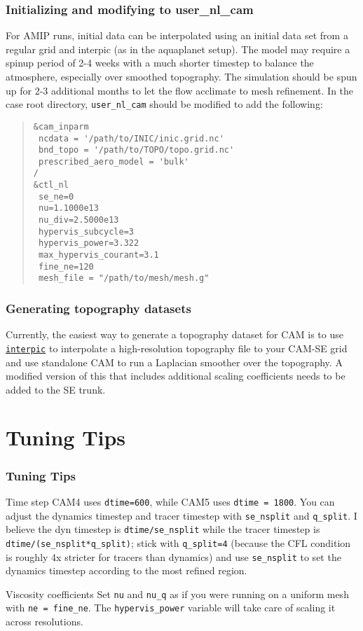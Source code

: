 \documentclass{beamer}
\newcommand{\interpic}{\hyperlink{interpic}{\texttt{interpic}}}
\begin{document}
%
\begin{frame}[containsverbatim]
\frametitle{Initializing and modifying to user\_nl\_cam }
\begin{block}{}
For AMIP runs, initial data can be interpolated using an initial data set from a regular grid and interpic (as in the aquaplanet setup). The model may require a spinup period of 2-4 weeks with a much shorter timestep to balance the atmosphere, especially over smoothed topography. The simulation should be spun up for 2-3 additional months to let the flow acclimate to mesh refinement. In the case root directory, \verb|user_nl_cam| should be modified to add the following:
\end{block}
\begin{block}{}
\begin{quote}
\tiny
\begin{verbatim}
&cam_inparm
 ncdata = '/path/to/INIC/inic.grid.nc'
 bnd_topo = '/path/to/TOPO/topo.grid.nc'
 prescribed_aero_model = 'bulk'
/
&ctl_nl
 se_ne=0
 nu=1.1000e13
 nu_div=2.5000e13
 hypervis_subcycle=3
 hypervis_power=3.322
 max_hypervis_courant=3.1
 fine_ne=120
 mesh_file = "/path/to/mesh/mesh.g"
\end{verbatim}
\end{quote}
\end{block}
\end{frame}
%
\begin{frame}
\frametitle{Generating topography datasets}
\begin{block}{}
Currently, the easiest way to generate a topography dataset for CAM is to use \interpic{} to interpolate a high-resolution topography file to your CAM-SE grid and use standalone CAM to run a Laplacian smoother over the topography. A modified version of this that includes additional scaling coefficients needs to be added to the SE trunk.
\end{block}
\end{frame}
%
\section{Tuning Tips}
\begin{frame}[containsverbatim]
\frametitle{Tuning Tips}
\begin{block}{Time step}
CAM4 uses \verb|dtime=600|, while CAM5 uses \verb|dtime = 1800|. You can adjust the dynamics timestep and tracer timestep with \verb|se_nsplit| and \verb|q_split|. I believe the dyn timestep is \verb|dtime/se_nsplit| while the tracer timestep is \verb|dtime/(se_nsplit*q_split)|; stick with \verb|q_split=4| (because the CFL condition is roughly 4x stricter for tracers than dynamics) and use \verb|se_nsplit| to set the dynamics timestep according to the most refined region.
\end{block}
\begin{block}{Viscosity coefficients}
Set \verb|nu| and \verb|nu_q| as if you were running on a uniform mesh with \verb|ne = fine_ne|. The \verb|hypervis_power| variable will take care of scaling it across resolutions.
\end{block}
\end{frame}
\end{document}
